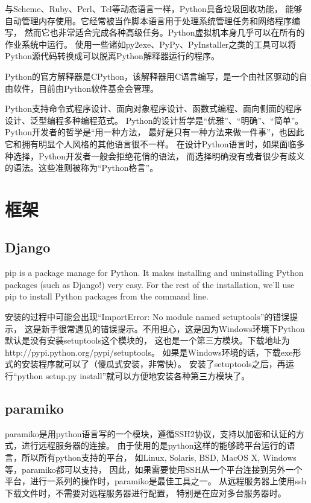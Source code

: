 \documentclass{book}
\begin{document}
与Scheme、Ruby、Perl、Tcl等动态语言一样，Python具备垃圾回收功能，
能够自动管理内存使用。它经常被当作脚本语言用于处理系统管理任务和网络程序编写，
然而它也非常适合完成各种高级任务。Python虚拟机本身几乎可以在所有的作业系统中运行。
使用一些诸如py2exe、PyPy、PyInstaller之类的工具可以将Python源代码转换成可以脱离Python解释器运行的程序。

Python的官方解释器是CPython，该解释器用C语言编写，是一个由社区驱动的自由软件，目前由Python软件基金会管理。

Python支持命令式程序设计、面向对象程序设计、函数式编程、面向侧面的程序设计、泛型编程多种编程范式。
Python的设计哲学是“优雅”、“明确”、“简单”。Python开发者的哲学是“用一种方法，
最好是只有一种方法来做一件事”，也因此它和拥有明显个人风格的其他语言很不一样。
在设计Python语言时，如果面临多种选择，Python开发者一般会拒绝花俏的语法，
而选择明确没有或者很少有歧义的语法。这些准则被称为“Python格言”。

\section{框架}

\subsection{Django}

pip is a package manage for Python. 
It makes installing and uninstalling Python packages (such as Django!) very easy. 
For the rest of the installation, we’ll use pip to install Python packages from the command line.

安装的过程中可能会出现“ImportError: No module named setuptools”的错误提示，
这是新手很常遇见的错误提示。不用担心，这是因为Windows环境下Python默认是没有安装setuptools这个模块的，
这也是一个第三方模块。下载地址为http://pypi.python.org/pypi/setuptools。
如果是Windows环境的话，下载exe形式的安装程序就可以了（傻瓜式安装，非常快）。
安装了setuptools之后，再运行“python setup.py install”就可以方便地安装各种第三方模块了。

\subsection{paramiko}

paramiko是用python语言写的一个模块，遵循SSH2协议，支持以加密和认证的方式，进行远程服务器的连接。
由于使用的是python这样的能够跨平台运行的语言，所以所有python支持的平台，
如Linux, Solaris, BSD, MacOS X, Windows等，paramiko都可以支持，
因此，如果需要使用SSH从一个平台连接到另外一个平台，进行一系列的操作时，paramiko是最佳工具之一。
从远程服务器上使用ssh下载文件时，不需要对远程服务器进行配置，
特别是在应对多台服务器时。
\end{document}

